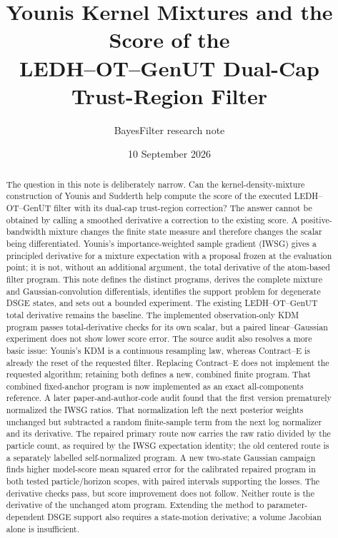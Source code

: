 \documentclass[11pt]{article}
\title{Younis Kernel Mixtures and the Score of the\\
LEDH--OT--GenUT Dual-Cap Trust-Region Filter}
\author{BayesFilter research note}
\date{10 September 2026}
\newcommand{\GenUT}{\ensuremath{\mathrm{GenUT}}}
\begin{document}
\maketitle

\begin{abstract}
The question in this note is deliberately narrow.  Can the
kernel-density-mixture construction of Younis and Sudderth
\citep{younis2023,younis2024} help compute the score of the executed
LEDH--OT--GenUT filter with its dual-cap trust-region correction?  The answer
cannot be obtained by calling a smoothed derivative a correction to the
existing score.  A positive-bandwidth mixture changes the finite state
measure and therefore changes the scalar being differentiated.  Younis's
importance-weighted sample gradient (IWSG) gives a principled derivative for
a mixture expectation with a proposal frozen at the evaluation point; it is
not, without an additional argument, the total derivative of the
atom-based filter program.  This note defines the distinct programs, derives
the complete mixture and Gaussian-convolution differentials, identifies the
support problem for degenerate DSGE states, and sets out a bounded experiment.
The existing LEDH--OT--\GenUT{} total derivative remains the baseline.  The
implemented observation-only KDM program passes total-derivative checks for
its own scalar, but a paired linear--Gaussian experiment does not show lower
score error.  The source audit also resolves a more basic issue: Younis's KDM
is a continuous resampling law, whereas Contract--E is already the reset of
the requested filter.  Replacing Contract--E does not implement the requested
algorithm; retaining both defines a new, combined finite program.  That
combined fixed-anchor program is now implemented as an exact all-components
reference.  A later paper-and-author-code audit found that the first version
prematurely normalized the IWSG ratios.  That normalization left the next
posterior weights unchanged but subtracted a random finite-sample term from
the next log normalizer and its derivative.  The repaired primary route now
carries the raw ratio divided by the particle count, as required by the IWSG
expectation identity; the old centered route is a separately labelled
self-normalized program.  A new two-state Gaussian campaign finds higher
model-score mean squared error for the calibrated repaired program in both
tested particle/horizon scopes, with paired intervals supporting the losses.
The derivative checks pass, but score improvement does not follow.  Neither
route is the derivative of the unchanged atom program.  Extending the method
to parameter-dependent DSGE support also requires a state-motion derivative;
a volume Jacobian alone is insufficient.
\end{abstract}
\end{document}
